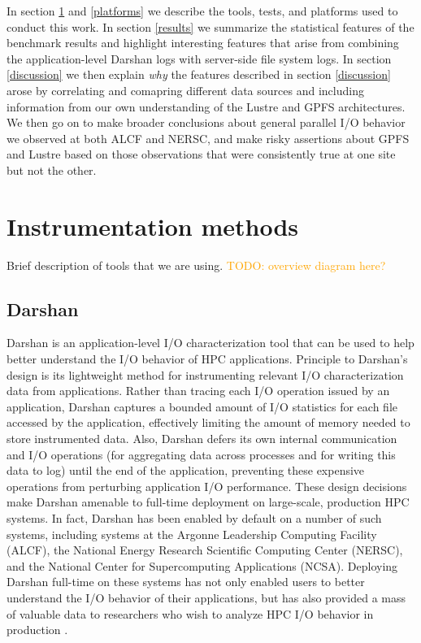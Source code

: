 \documentclass[conference,10pt,compsocconf]{IEEEtran}
\newcommand{\todo}[1]{\textcolor{Orange}{TODO: #1}}
\begin{document}
In section \ref{methods} and \ref{platforms} we describe the tools, tests, and
platforms used to conduct this work.  In section \ref{results} we summarize the
statistical features of the benchmark results and highlight interesting features
that arise from combining the application-level Darshan logs with server-side
file system logs.  In section \ref{discussion} we then explain \emph{why} the
features described in section \ref{discussion} arose by correlating and
comapring different data sources and including information from our own
understanding of the Lustre and GPFS architectures.  We then go on to make
broader conclusions about general parallel I/O behavior we observed at both
ALCF and NERSC, and make risky assertions about GPFS and Lustre based on those
observations that were consistently true at one site but not the other.

\section{Instrumentation methods} \label{methods}

Brief description of tools that we are using.
\todo{overview diagram here?}

\subsection{Darshan}

Darshan is an application-level I/O characterization tool that can be used to
help better understand the I/O behavior of HPC applications. Principle to
Darshan's design is its lightweight method for instrumenting relevant I/O
characterization data from applications. Rather than tracing each I/O operation
issued by an application, Darshan captures a bounded amount of I/O statistics
for each file accessed by the application, effectively limiting the amount of
memory needed to store instrumented data. Also, Darshan defers its own internal
communication and I/O operations (for aggregating data across processes and for
writing this data to log) until the end of the application, preventing these
expensive operations from perturbing application I/O performance. These design
decisions make Darshan amenable to full-time deployment on large-scale,
production HPC systems. In fact, Darshan has been enabled by default on a number
of such systems, including systems at the Argonne Leadership Computing Facility
(ALCF), the National Energy Research Scientific Computing Center (NERSC), and
the National Center for Supercomputing Applications (NCSA). Deploying Darshan
full-time on these systems has not only enabled users to better understand the
I/O behavior of their applications, but has also provided a mass of valuable
data to researchers who wish to analyze HPC I/O behavior in production
\cite{carns200924,carns2011understanding,luu2015multiplatform,snyder2015techniques}.
\end{document}
